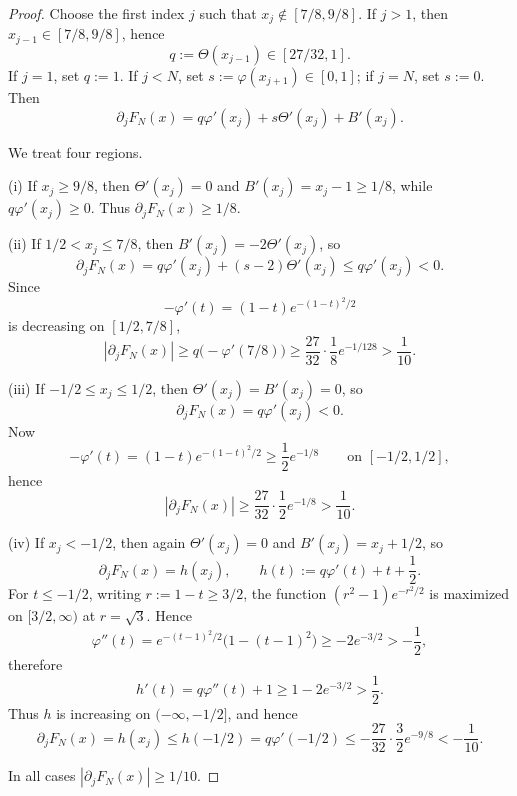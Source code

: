 \documentclass[11pt]{article}
\begin{document}
\begin{proof}
Choose the first index $j$ such that $x_j\notin [7/8,9/8]$.
If $j>1$, then $x_{j-1}\in [7/8,9/8]$, hence
\[
q:=\Theta(x_{j-1})\in [27/32,1].
\]
If $j=1$, set $q:=1$.
If $j<N$, set $s:=\varphi(x_{j+1})\in [0,1]$; if $j=N$, set $s:=0$.
Then
\[
\partial_j F_N(x)=q\varphi'(x_j)+s\Theta'(x_j)+B'(x_j).
\]

We treat four regions.

(i) If $x_j\ge 9/8$, then $\Theta'(x_j)=0$ and $B'(x_j)=x_j-1\ge 1/8$, while $q\varphi'(x_j)\ge 0$.
Thus $\partial_j F_N(x)\ge 1/8$.

(ii) If $1/2<x_j\le 7/8$, then $B'(x_j)=-2\Theta'(x_j)$, so
\[
\partial_j F_N(x)=q\varphi'(x_j)+(s-2)\Theta'(x_j)\le q\varphi'(x_j)<0.
\]
Since
\[
-\varphi'(t)=(1-t)e^{-(1-t)^2/2}
\]
is decreasing on $[1/2,7/8]$,
\[
|\partial_j F_N(x)|
\ge
q\bigl(-\varphi'(7/8)\bigr)
\ge
\frac{27}{32}\cdot \frac18 e^{-1/128}
>
\frac{1}{10}.
\]

(iii) If $-1/2\le x_j\le 1/2$, then $\Theta'(x_j)=B'(x_j)=0$, so
\[
\partial_j F_N(x)=q\varphi'(x_j)<0.
\]
Now
\[
-\varphi'(t)=(1-t)e^{-(1-t)^2/2}\ge \frac12 e^{-1/8}
\qquad
\text{on }[-1/2,1/2],
\]
hence
\[
|\partial_j F_N(x)|\ge \frac{27}{32}\cdot \frac12 e^{-1/8}>\frac{1}{10}.
\]

(iv) If $x_j< -1/2$, then again $\Theta'(x_j)=0$ and $B'(x_j)=x_j+1/2$, so
\[
\partial_j F_N(x)=h(x_j),
\qquad
h(t):=q\varphi'(t)+t+\frac12.
\]
For $t\le -1/2$, writing \(r:=1-t\ge 3/2\), the function
\((r^2-1)e^{-r^2/2}\) is maximized on \([3/2,\infty)\) at \(r=\sqrt 3\). Hence
\[
\varphi''(t)=e^{-(t-1)^2/2}\bigl(1-(t-1)^2\bigr)\ge -2e^{-3/2}>-\frac12,
\]
therefore
\[
h'(t)=q\varphi''(t)+1\ge 1-2e^{-3/2}>\frac12.
\]
Thus $h$ is increasing on $(-\infty,-1/2]$, and hence
\[
\partial_j F_N(x)=h(x_j)\le h(-1/2)=q\varphi'(-1/2)\le -\frac{27}{32}\cdot \frac32 e^{-9/8}<-\frac{1}{10}.
\]

In all cases $|\partial_j F_N(x)|\ge 1/10$.
\end{proof}
\end{document}
